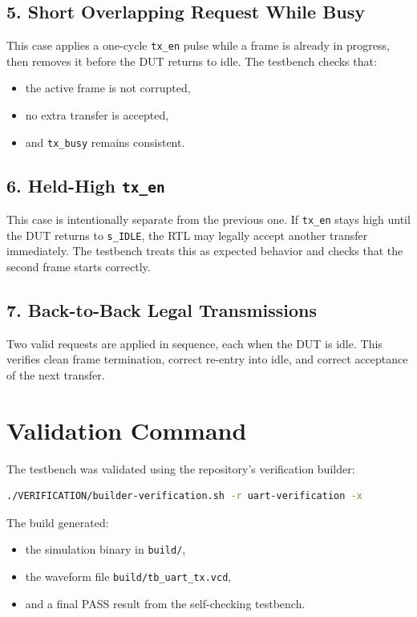 \documentclass[12pt]{article}
\begin{document}
\subsection*{5. Short Overlapping Request While Busy}

This case applies a one-cycle \texttt{tx\_en} pulse while a frame is already in
progress, then removes it before the DUT returns to idle. The testbench checks
that:

\begin{itemize}
    \item the active frame is not corrupted,
    \item no extra transfer is accepted,
    \item and \texttt{tx\_busy} remains consistent.
\end{itemize}

\subsection*{6. Held-High \texttt{tx\_en}}

This case is intentionally separate from the previous one. If \texttt{tx\_en}
stays high until the DUT returns to \texttt{s\_IDLE}, the RTL may legally accept
another transfer immediately. The testbench treats this as expected behavior and
checks that the second frame starts correctly.

\subsection*{7. Back-to-Back Legal Transmissions}

Two valid requests are applied in sequence, each when the DUT is idle. This
verifies clean frame termination, correct re-entry into idle, and correct
acceptance of the next transfer.

\section{Validation Command}

The testbench was validated using the repository's verification builder:

\begin{lstlisting}[language=bash]
./VERIFICATION/builder-verification.sh -r uart-verification -x
\end{lstlisting}

The build generated:

\begin{itemize}
    \item the simulation binary in \texttt{build/},
    \item the waveform file \texttt{build/tb\_uart\_tx.vcd},
    \item and a final PASS result from the self-checking testbench.
\end{itemize}
\end{document}
